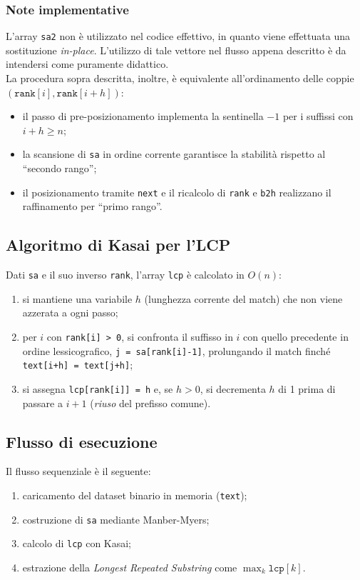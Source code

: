 			\subsubsection*{Note implementative}
				L'array \texttt{sa2} non è utilizzato nel codice effettivo, in quanto viene effettuata una sostituzione \textit{in-place}.
				L'utilizzo di tale vettore nel flusso appena descritto è da intendersi come puramente didattico. \\
				La procedura sopra descritta, inoltre, è equivalente all'ordinamento delle coppie $(\texttt{rank}[i], \texttt{rank}[i+h])$:
				\begin{itemize}
						\item il passo di pre-posizionamento implementa la sentinella $-1$ per i suffissi con $i+h \ge n$;
						\item la scansione di \texttt{sa} in ordine corrente garantisce la stabilità rispetto al “secondo rango”;
						\item il posizionamento tramite \texttt{next} e il ricalcolo di \texttt{rank} e \texttt{b2h} realizzano il raffinamento per “primo rango”.
				\end{itemize}
		
		\subsection{Algoritmo di Kasai per l'LCP}
			Dati \texttt{sa} e il suo inverso \texttt{rank}, l'array \texttt{lcp} è calcolato in $O(n)$:
			\begin{enumerate}
				\item si mantiene una variabile $h$ (lunghezza corrente del match) che non viene azzerata a ogni passo;
				\item per $i$ con \texttt{rank[i] > 0}, si confronta il suffisso in $i$ con quello precedente in ordine lessicografico, \texttt{j = sa[rank[i]-1]}, prolungando il match finché \texttt{text[i+h] = text[j+h]};
				\item si assegna \texttt{lcp[rank[i]] = h} e, se $h>0$, si decrementa $h$ di 1 prima di passare a $i+1$ (\emph{riuso} del prefisso comune).
			\end{enumerate}
		
		\subsection{Flusso di esecuzione}
			Il flusso sequenziale è il seguente:
			\begin{enumerate}
				\item caricamento del dataset binario in memoria (\texttt{text});
				\item costruzione di \texttt{sa} mediante Manber-Myers;
				\item calcolo di \texttt{lcp} con Kasai;
				\item estrazione della \emph{Longest Repeated Substring} come $\max_k \texttt{lcp}[k]$.
			\end{enumerate}
		
